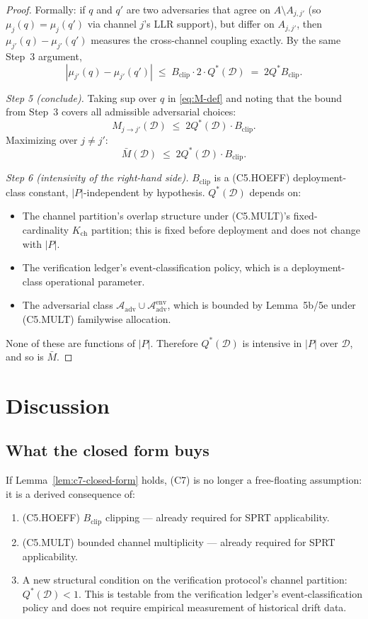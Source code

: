 \documentclass{article}
\newcommand{\Bclip}{B_{\mathrm{clip}}}
\newcommand{\Kch}{K_{\mathrm{ch}}}
\newcommand{\Aadv}{\mathcal{A}_{\mathrm{adv}}}
\begin{document}
\begin{proof}
Formally: if $q$ and $q'$ are two adversaries that agree on
$A \setminus A_{j, j'}$ (so $\mu_j(q) = \mu_j(q')$ via channel
$j$'s LLR support), but differ on $A_{j, j'}$, then
$\mu_{j'}(q) - \mu_{j'}(q')$ measures the cross-channel coupling
exactly.  By the same Step~3 argument,
\[
  |\mu_{j'}(q) - \mu_{j'}(q')|
  \;\leq\; \Bclip \cdot 2 \cdot Q^*(\mathcal{D})
  \;=\; 2 Q^* \Bclip.
\]

\emph{Step 5 (conclude).}  Taking sup over $q$ in
\eqref{eq:M-def} and noting that the bound from Step~3 covers all
admissible adversarial choices:
\[
  M_{j \to j'}(\mathcal{D}) \;\leq\; 2 Q^*(\mathcal{D}) \cdot \Bclip.
\]
Maximizing over $j \neq j'$:
\[
  \bar{M}(\mathcal{D}) \;\leq\; 2 Q^*(\mathcal{D}) \cdot \Bclip.
\]

\emph{Step 6 (intensivity of the right-hand side).}  $\Bclip$ is a
(C5.HOEFF) deployment-class constant, $|P|$-independent by
hypothesis.  $Q^*(\mathcal{D})$ depends on:
\begin{itemize}
\item The channel partition's overlap structure under (C5.MULT)'s
  fixed-cardinality $\Kch$ partition; this is fixed before
  deployment and does not change with $|P|$.
\item The verification ledger's event-classification policy, which
  is a deployment-class operational parameter.
\item The adversarial class $\Aadv \cup \Aadv^{\mathrm{env}}$,
  which is bounded by Lemma~5b/5e under (C5.MULT) familywise
  allocation.
\end{itemize}
None of these are functions of $|P|$.  Therefore $Q^*(\mathcal{D})$
is intensive in $|P|$ over $\mathcal{D}$, and so is $\bar{M}$.
\end{proof}

\section{Discussion}

\subsection{What the closed form buys}

If Lemma~\ref{lem:c7-closed-form} holds, (C7) is no longer a
free-floating assumption: it is a derived consequence of:
\begin{enumerate}
\item (C5.HOEFF) $\Bclip$ clipping --- already required for SPRT
  applicability.
\item (C5.MULT) bounded channel multiplicity --- already required
  for SPRT applicability.
\item A new structural condition on the verification protocol's
  channel partition: $Q^*(\mathcal{D}) < 1$.  This is testable from
  the verification ledger's event-classification policy and does
  not require empirical measurement of historical drift data.
\end{enumerate}
\end{document}
